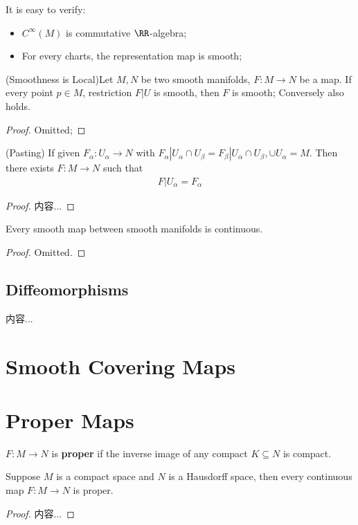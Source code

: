 \documentclass[Total.tex]{subfiles}
\begin{document}
			It is easy to verify:
			\begin{itemize}
				\item $C^\infty(M)$ is commutative $\RR$-algebra;
				\item For every charts, the representation map is smooth;
			\end{itemize}
			
			\begin{lemma}
				(Smoothness is Local)Let $M,N$ be two smooth manifolds, $F:M\rightarrow N$ be a map. If every point $p\in M$, restriction $F|U$ is smooth, then $F$ is smooth; Conversely also holds.
			\end{lemma}
			\begin{proof}
				Omitted;
			\end{proof}
			
			\begin{lemma}
				(Pasting) If given $F_\alpha:U_\alpha\rightarrow N$ with $F_\alpha|U_\alpha\cap U_\beta=F_\beta|U_\alpha\cap U_\beta,\cup U_\alpha=M$. Then there exists $F:M\rightarrow N$ such that
				\begin{gather*}
					F|U_\alpha=F_\alpha
				\end{gather*}
			\end{lemma}
			\begin{proof}
				内容...
			\end{proof}
			
			\begin{lemma}
				Every smooth map between smooth manifolds is continuous.
			\end{lemma}
			\begin{proof}
				Omitted.
			\end{proof}
			
			\subsection{Diffeomorphisms}
			\begin{Def}
				内容...
			\end{Def}
		\section{Smooth Covering Maps}
		\section{Proper Maps}
			\begin{Def}
				$F:M\rightarrow N$ is \textbf{proper} if the inverse image of any compact $K\subseteq N$ is compact.
			\end{Def}
			\begin{lemma}
				Suppose $M$ is a compact space and $N$ is a Hausdorff space, then every continuous map $F:M\rightarrow N$ is proper. 
			\end{lemma}
			\begin{proof}
				内容...
			\end{proof}
\end{document}
